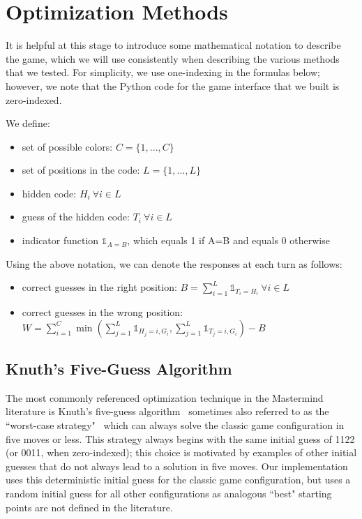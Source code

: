 \documentclass[11pt]{article}
\begin{document}
\newpage

\section{Optimization Methods}

It is helpful at this stage to introduce some mathematical notation to describe the game, which we will use consistently when describing the various methods that we tested. For simplicity, we use one-indexing in the formulas below; however, we note that the Python code for the game interface that we built is zero-indexed. \medskip

\noindent We define:
\begin{itemize}
\item set of possible colors: $C = \{1, ..., C\}$
\item set of positions in the code: $L = \{1, ..., L\}$
\item hidden code: $H_i \ \forall i \in L$
\item guess of the hidden code: $T_i \ \forall i \in L$
\item indicator function $\mathbb{1}_{A=B}$, which equals 1 if A=B and equals 0 otherwise
\end{itemize}

\noindent Using the above notation, we can denote the responses at each turn as follows:

\begin{itemize}
\item correct guesses in the right position: $B = \sum_{i=1}^L \mathbb{1}_{T_i=H_i} \ \forall i \in L$
\item correct guesses in the wrong position: $W = \sum_{i=1}^{C} \min(\sum_{j=1}^{L}\mathbb{1}_{H_j=i, G_i}, \sum_{j=1}^{L}\mathbb{1}_{T_j=i, G_i}) - B$
\end{itemize}

\subsection{Knuth's Five-Guess Algorithm}

The most commonly referenced optimization technique in the Mastermind literature is Knuth's five-guess algorithm \cite{knuth76} \textendash \ sometimes also referred to as the ``worst-case strategy" \textendash \ which can always solve the classic game configuration in five moves or less. This strategy always begins with the same initial guess of 1122 (or 0011, when zero-indexed); this choice is motivated by examples of other initial guesses that do not always lead to a solution in five moves. Our implementation uses this deterministic initial guess for the classic game configuration, but uses a random initial guess for all other configurations as analogous ``best" starting points are not defined in the literature.
\end{document}
